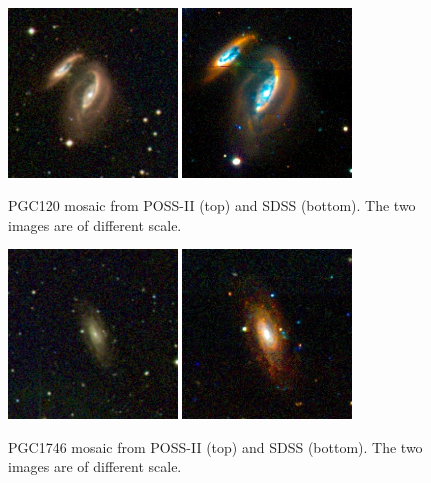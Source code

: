\documentclass[authoryear, 12pt, 5p, times]{elsarticle}
\begin{document}
\begin{figure}[h]
\centering
\includegraphics[width=0.4\textwidth]{figures/DSS_120_BEST}
\includegraphics[width=0.4\textwidth]{figures/SDSS_120_LOW}	
\caption{PGC120 mosaic from POSS-II (top) and SDSS (bottom). The two images are of different scale.}
\label{fig:comparison}
\end{figure}

\begin{figure}[h]
\centering
\includegraphics[width=0.4\textwidth]{figures/DSS_1154_BEST}	
\includegraphics[width=0.4\textwidth]{figures/SDSS_1154_BEST}
\caption{PGC1746 mosaic from POSS-II (top) and SDSS (bottom). The two images are of different scale.}
\label{sdss_dss_comp}
\end{figure}
\end{document}
